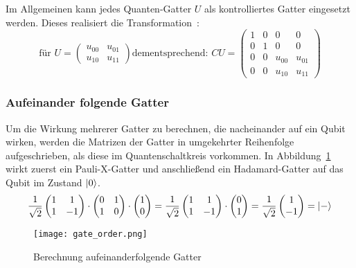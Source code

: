 Im Allgemeinen kann jedes Quanten-Gatter \(U\) als kontrolliertes Gatter eingesetzt werden. 
Dieses realisiert die Transformation~\cite{Hoever2023QC}: 
\[
  \text{für }
  U = 
  \begin{pmatrix}
    u_{00} & u_{01}\\
    u_{10} & u_{11}
    \end{pmatrix}
    \text{dementsprechend: }
    CU = 
  \begin{pmatrix}
    1 & 0 & 0 & 0\\
    0 & 1 & 0 & 0\\
    0 & 0 & u_{00} & u_{01}\\
    0 & 0 & u_{10} & u_{11}
    \end{pmatrix}
  \]


\subsubsection*{Aufeinander folgende Gatter} 

Um die Wirkung mehrerer Gatter zu berechnen, die nacheinander auf ein Qubit wirken, 
werden die Matrizen der Gatter in umgekehrter Reihenfolge aufgeschrieben, 
als diese im Quantenschaltkreis vorkommen. 
In Abbildung~\ref{fig:gate_order} wirkt zuerst ein Pauli-X-Gatter und anschließend ein Hadamard-Gatter auf das Qubit im Zustand \(\ket{0}\).
\[
  \frac{1}{\sqrt{2}}
  \begin{pmatrix}
    1 & 1 \\
    1 & -1
    \end{pmatrix} 
    \cdot
    \begin{pmatrix}
      0 & 1 \\
      1 & 0
      \end{pmatrix} 
    \cdot
    \begin{pmatrix}
      1  \\
      0 
      \end{pmatrix} 
      =
      \frac{1}{\sqrt{2}}
      \begin{pmatrix}
        1 & 1 \\
        1 & -1
        \end{pmatrix} 
      \cdot
      \begin{pmatrix}
        0  \\
        1 
        \end{pmatrix} 
        =
        \frac{1}{\sqrt{2}}
        \begin{pmatrix}
          1  \\
          -1 
          \end{pmatrix}
        =
        \ket{-}
  \]
\begin{figure}[H]
  \centering
  \texttt{[image: gate\_order.png]}
  \caption{Berechnung aufeinanderfolgende Gatter}
  \label{fig:gate_order}
\end{figure}

